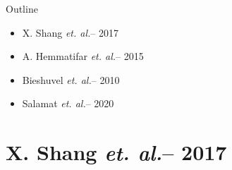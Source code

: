\documentclass{beamer}
\title[\presentationTitleShort]{\presentationTitleLong}
\subtitle{\presentationSubTitle}
\newcommand{\etal}{{\it et. al.}}
\begin{document}

{
  \begin{frame}
    \maketitle
  \end{frame}
}


\begin{frame}{Outline}
  \begin{itemize}
  \item X. Shang \etal -- 2017
  \item A. Hemmatifar \etal -- 2015
  \item Bieshuvel \etal -- 2010
  \item Salamat \etal -- 2020
  \end{itemize}
\end{frame}


\section{X. Shang \etal -- 2017}



\end{document}
